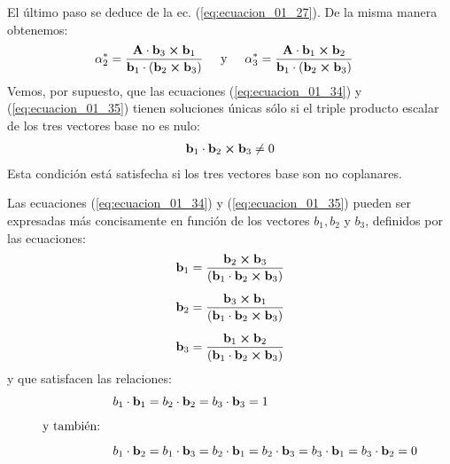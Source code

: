 \documentclass[12pt]{article}
\begin{document}
El último paso se deduce de la ec. (\ref{eq:ecuacion_01_27}). De la misma manera obtenemos:
\begin{align}
\alpha_{2}^{*} &= \dfrac{\vb{A} \cdot \vb{b}_{3} \cp \vb{b}_{1}}{\vb{b}_{1} \cdot \left( \vb{b}_{2} \cp \vb{b}_{3} \right)} \hspace{0.5cm} \text{y} \hspace{0.5cm}
\alpha_{3}^{*} = \dfrac{\vb{A} \cdot \vb{b}_{1} \cp \vb{b}_{2}}{\vb{b}_{1} \cdot \left( \vb{b}_{2} \cp \vb{b}_{3} \right)}
\label{eq:ecuacion_01_35}
\end{align}
Vemos, por supuesto, que las ecuaciones (\ref{eq:ecuacion_01_34}) y (\ref{eq:ecuacion_01_35}) tienen soluciones únicas sólo si el triple producto escalar de los tres vectores base no es nulo:
\begin{align*}
    \vb{b}_{1} \cdot \vb{b}_{2} \cp \vb{b}_{3} \neq 0
\end{align*}
Esta condición está satisfecha si los tres vectores base son no coplanares.
\par
Las ecuaciones (\ref{eq:ecuacion_01_34}) y (\ref{eq:ecuacion_01_35}) pueden ser expresadas más concisamente en función de los vectores $b_{1}, b_{2}$ y $b_{3}$, definidos por las ecuaciones:
\begin{align}
\begin{aligned}
\vb{b}_{1} &= \dfrac{\vb{b}_{2} \cp \vb{b}_{3}}{\left( \vb{b}_{1} \cdot \vb{b}_{2} \cp \vb{b}_{3} \right)} \\[0.5em]
\vb{b}_{2} &= \dfrac{\vb{b}_{3} \cp \vb{b}_{1}}{\left( \vb{b}_{1} \cdot \vb{b}_{2} \cp \vb{b}_{3} \right)} \\[0.5em]
\vb{b}_{3} &= \dfrac{\vb{b}_{1} \cp \vb{b}_{2}}{\left( \vb{b}_{1} \cdot \vb{b}_{2} \cp \vb{b}_{3} \right)}
\end{aligned}
\label{eq:ecuacion_01_36}
\end{align}
y que satisfacen las relaciones:
\begin{align}
\begin{aligned}
&{} \hspace{2cm} b_{1} \cdot \vb{b}_{1} = b_{2} \cdot \vb{b}_{2} = b_{3} \cdot \vb{b}_{3} = 1 \\[0.5em]
&\text{y también:} \\[0.5em]
&{} \hspace{2cm} b_{1} \cdot \vb{b}_{2} = b_{1} \cdot \vb{b}_{3} = b_{2} \cdot \vb{b}_{1} = b_{2} \cdot \vb{b}_{3} = b_{3} \cdot \vb{b}_{1} = b_{3} \cdot \vb{b}_{2} = 0
\end{aligned}
\label{eq:ecuacion_01_37}
\end{align}
\end{document}
